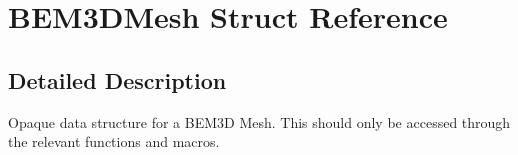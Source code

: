 \section{B\+E\+M3\+D\+Mesh Struct Reference}
\label{structBEM3DMesh}


\subsection{Detailed Description}
Opaque data structure for a B\+E\+M3D Mesh. This should only be accessed through the relevant functions and macros. 